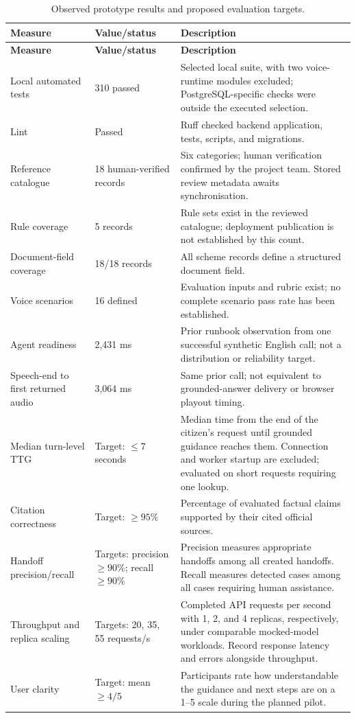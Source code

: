 \documentclass[11pt,a4paper,oneside]{report}
\renewcommand{\arraystretch}{1.18}
\begin{document}
\begingroup
\footnotesize
\renewcommand{\arraystretch}{1.1}
\begin{longtable}{@{}P{0.26\textwidth}P{0.21\textwidth}P{0.45\textwidth}@{}}
\caption{Observed prototype results and proposed evaluation targets.}
\label{tab:results}\\
\toprule
\textbf{Measure} & \textbf{Value/status} & \textbf{Description} \\
\midrule
\endfirsthead
\toprule
\textbf{Measure} & \textbf{Value/status} & \textbf{Description} \\
\midrule
\endhead
\bottomrule
\endfoot
Local automated tests & 310 passed & Selected local suite, with two
voice-runtime modules excluded; PostgreSQL-specific checks were outside the
executed selection. \\
Lint & Passed & Ruff checked backend application, tests, scripts, and migrations. \\
Reference catalogue & 18 human-verified records & Six categories; human
verification confirmed by the project team. Stored review metadata awaits
synchronisation. \\
Rule coverage & 5 records & Rule sets exist in the reviewed catalogue; deployment
publication is not established by this count. \\
Document-field coverage & 18/18 records & All scheme records define a structured
document field. \\
Voice scenarios & 16 defined & Evaluation inputs and rubric exist; no complete
scenario pass rate has been established. \\
Agent readiness & 2,431 ms & Prior runbook observation from one successful
synthetic English call; not a distribution or reliability target. \\
Speech-end to first returned audio & 3,064 ms & Same prior call; not equivalent
to grounded-answer delivery or browser playout timing. \\
Median turn-level TTG & Target: $\leq 7$ seconds & Median time from the end of
the citizen's request until grounded guidance reaches them. Connection and
worker startup are excluded; evaluated on short requests requiring one lookup. \\
Citation correctness & Target: $\geq 95\%$ & Percentage of evaluated factual
claims supported by their cited official sources. \\
Handoff precision/recall & Targets: precision $\geq 90\%$; recall $\geq 90\%$ &
Precision measures appropriate handoffs among all created handoffs. Recall
measures detected cases among all cases requiring human assistance. \\
Throughput and replica scaling & Targets: 20, 35, 55 requests/s & Completed API
requests per second with 1, 2, and 4 replicas, respectively, under comparable
mocked-model workloads. Record response latency and errors alongside throughput. \\
User clarity & Target: mean $\geq 4/5$ & Participants rate how understandable the
guidance and next steps are on a 1--5 scale during the planned pilot. \\
\end{longtable}
\endgroup
\end{document}
